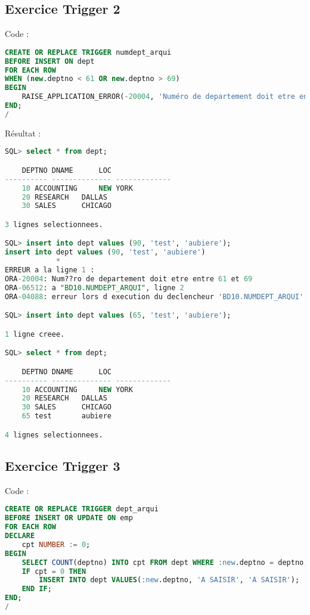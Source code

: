 \documentclass{article}
\begin{document}
\subsection{Exercice Trigger 2}
Code :
\begin{lstlisting}[language=SQL,
    deletekeywords={char},
    morekeywords={DECLARE, LOOP, TYPE, FOR, IF, IS, OPEN, FETCH, DBMS_OUTPUT, PUT_LINE}]
CREATE OR REPLACE TRIGGER numdept_arqui
BEFORE INSERT ON dept
FOR EACH ROW
WHEN (new.deptno < 61 OR new.deptno > 69)
BEGIN
    RAISE_APPLICATION_ERROR(-20004, 'Numéro de departement doit etre entre 61 et 69');
END;
/
\end{lstlisting}

Résultat :
\begin{lstlisting}[language=SQL,
    morekeywords={DECLARE, LOOP, TYPE, FOR, IF, IS, OPEN, FETCH, DBMS_OUTPUT, PUT_LINE}]
SQL> select * from dept;

    DEPTNO DNAME	  LOC
---------- -------------- -------------
	10 ACCOUNTING	  NEW YORK
	20 RESEARCH	  DALLAS
	30 SALES	  CHICAGO

3 lignes selectionnees.

SQL> insert into dept values (90, 'test', 'aubiere');
insert into dept values (90, 'test', 'aubiere')
            *
ERREUR a la ligne 1 :
ORA-20004: Num??ro de departement doit etre entre 61 et 69
ORA-06512: a "BD10.NUMDEPT_ARQUI", ligne 2
ORA-04088: erreur lors d execution du declencheur 'BD10.NUMDEPT_ARQUI'

SQL> insert into dept values (65, 'test', 'aubiere');

1 ligne creee.

SQL> select * from dept;

    DEPTNO DNAME	  LOC
---------- -------------- -------------
	10 ACCOUNTING	  NEW YORK
	20 RESEARCH	  DALLAS
	30 SALES	  CHICAGO
	65 test 	  aubiere

4 lignes selectionnees.
\end{lstlisting}


\subsection{Exercice Trigger 3}
Code :
\begin{lstlisting}[language=SQL,
    deletekeywords={char},
    morekeywords={DECLARE, LOOP, TYPE, FOR, IF, IS, OPEN, FETCH, DBMS_OUTPUT, PUT_LINE}]
CREATE OR REPLACE TRIGGER dept_arqui
BEFORE INSERT OR UPDATE ON emp
FOR EACH ROW
DECLARE
    cpt NUMBER := 0;
BEGIN
    SELECT COUNT(deptno) INTO cpt FROM dept WHERE :new.deptno = deptno;
    IF cpt = 0 THEN
        INSERT INTO dept VALUES(:new.deptno, 'A SAISIR', 'A SAISIR');
    END IF;
END;
/
\end{lstlisting}
\end{document}
